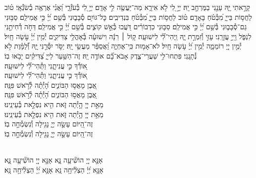 \documentclass[twoside, openany, parskip=half, 11pt]{book}
\begin{document}
{
קָרָ֣אתִי יָּ֑הּ עָנָ֖נִי בַמֶּרְחָ֣ב יָֽהּ׃
יְיָ֣ לִ֭י לֹ֣א אִירָ֑א מַה־יַּעֲשֶׂ֖ה לִ֣י אָדָֽם׃
יְיָ֣ לִ֭י בְּ֯עֹזְ֯רָ֑י וַ֝אֲנִ֗י אֶרְאֶ֥ה בְ֯שֹׂנְ֯אָֽי׃
ט֗וֹב לַחֲס֥וֹת בַּייָ֑ מִ֝בְּ֯טֹ֗חַ בָּאָדָֽם׃
ט֗וֹב לַחֲס֥וֹת בַּייָ֑ מִ֝בְּ֯טֹ֗חַ בִּנְדִיבִֽים׃
כׇּל־גּוֹיִ֥ם סְ֯בָב֑וּנִי בְּ֯שֵׁ֥ם יְ֝יָ֗ כִּ֣י אֲמִילַֽם׃
סַבּ֥וּנִי גַם־סְ֯בָב֑וּנִי בְּ֯שֵׁ֥ם יְ֝יָ֗ כִּ֣י אֲמִילַֽם׃
סַבּ֤וּנִי כִדְבוֹרִ֗ים דֹּ֭עֲכוּ כְּ֯אֵ֣שׁ קוֹצִ֑ים בְּ֯שֵׁ֥ם יְ֝יָ֗ כִּ֣י אֲמִילַֽם׃
דַּחֹ֣ה דְ֯חִיתַ֣נִי לִנְפֹּ֑ל וַ֖ייָ֣ עֲזָרָֽנִי׃
עָזִּ֣י וְ֯זִמְרָ֣ת יָ֑הּ וַֽיְהִי־לִ֗֝י לִישׁוּעָֽה׃
ק֤וֹל ׀ רִנָּ֬ה וִישׁוּעָ֗ה בְּ֯אׇהֳלֵ֥י צַדִּיקִ֑ים יְ֯מִ֥ין יְ֝יָ֗ עֹ֣שָׂה חָֽיִל׃
יְ֯מִ֣ין יְיָ֭ רוֹמֵמָ֑ה יְ֯מִ֥ין יְ֝יָ֗ עֹ֣שָׂה חָֽיִל׃
לֹא־אָמ֥וּת כִּֽי־אֶחְיֶ֑ה וַ֝אֲסַפֵּ֗ר מַעֲשֵׂ֥י יָֽהּ׃
יַסֹּ֣ר יִסְּ֯רַ֣נִּי יָּ֑הּ וְ֯֝לַמָּ֗וֶת לֹ֣א נְ֯תָנָֽנִי׃
פִּתְחוּ־לִ֥י שַׁעֲרֵי־צֶ֑דֶק אָבֹא־בָ֗֝ם אוֹדֶ֥ה יָֽהּ׃
זֶה־הַשַּׁ֥עַר לַייָ֑ צַ֝דִּיקִ֗ים יָבֹ֥אוּ בֽוֹ׃\\
א֭וֹדְ֯ךָ כִּ֣י עֲנִיתָ֑נִי וַתְּ֯הִי־לִ֗֝י לִישׁוּעָֽה׃ \\
\scriptsize{ א֭וֹדְ֯ךָ כִּ֣י עֲנִיתָ֑נִי \hfill וַתְּ֯הִי־לִ֗֝י לִישׁוּעָֽה׃ \\}\normalsize{}
אֶ֭בֶן מָאֲס֣וּ הַבּוֹנִ֑ים \hfill הָ֝יְ֯תָ֗ה לְ֯רֹ֣אשׁ פִּנָּֽה׃ \\
\scriptsize{ אֶ֭בֶן מָאֲס֣וּ הַבּוֹנִ֑ים \hfill הָ֝יְ֯תָ֗ה לְ֯רֹ֣אשׁ פִּנָּֽה׃ \\}\normalsize{}
מֵאֵ֣ת יְיָ֭ הָ֣יְ֯תָה זֹּ֑את \hfill הִ֖יא נִפְלָ֣את בְּ֯עֵינֵֽינוּ׃ \\
\scriptsize{ מֵאֵ֣ת יְיָ֭ הָ֣יְ֯תָה זֹּ֑את \hfill הִ֖יא נִפְלָ֣את בְּ֯עֵינֵֽינוּ׃ \\}\normalsize{}
זֶה־הַ֭יּוֹם עָשָׂ֣ה יְיָ֑ \hfill נָגִ֖ילָה וְ֯נִשְׂמְ֯חָ֣ה בֽוֹ׃ \\
\scriptsize{ זֶה־הַ֭יּוֹם עָשָׂ֣ה יְיָ֑ \hfill נָגִ֖ילָה וְ֯נִשְׂמְ֯חָ֣ה בֽוֹ׃ } \normalsize{}


\\
אָנָּ֣א יְיָ֭ הוֹשִׁ֘יעָ֥ה נָּ֑א \hfill \scriptsize{אָנָּ֣א יְיָ֭ הוֹשִׁ֘יעָ֥ה נָּ֑א}\\ \normalsize
אָנָּ֥א יְ֝יָ֗ הַצְלִ֘יחָ֥ה נָּֽא \hfill \scriptsize{ אָנָּ֥א יְ֝יָ֗ הַצְלִ֘יחָ֥ה נָּֽא׃}\\ \normalsize


}
\end{document}

